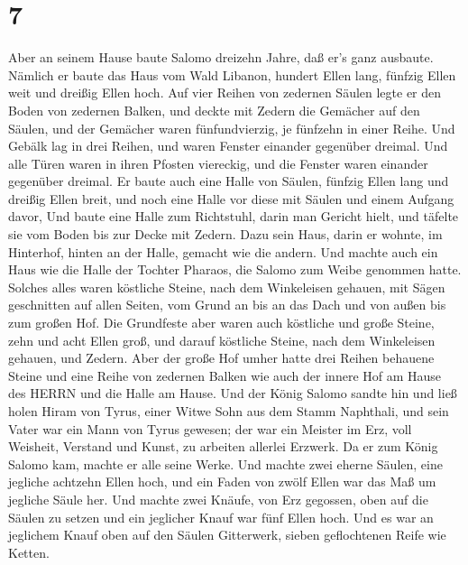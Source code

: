 \hypertarget{section-6}{%
\section{7}\label{section-6}}

 Aber an seinem Hause baute Salomo dreizehn Jahre, daß er's
ganz ausbaute.  Nämlich er baute das Haus vom Wald Libanon,
hundert Ellen lang, fünfzig Ellen weit und dreißig Ellen hoch. Auf vier
Reihen von zedernen Säulen legte er den Boden von zedernen Balken,
 und deckte mit Zedern die Gemächer auf den Säulen, und der
Gemächer waren fünfundvierzig, je fünfzehn in einer Reihe. 
Und Gebälk lag in drei Reihen, und waren Fenster einander gegenüber
dreimal.  Und alle Türen waren in ihren Pfosten viereckig,
und die Fenster waren einander gegenüber dreimal.  Er baute
auch eine Halle von Säulen, fünfzig Ellen lang und dreißig Ellen breit,
und noch eine Halle vor diese mit Säulen und einem Aufgang davor,
 Und baute eine Halle zum Richtstuhl, darin man Gericht
hielt, und täfelte sie vom Boden bis zur Decke mit Zedern. 
Dazu sein Haus, darin er wohnte, im Hinterhof, hinten an der Halle,
gemacht wie die andern. Und machte auch ein Haus wie die Halle der
Tochter Pharaos, die Salomo zum Weibe genommen hatte. 
Solches alles waren köstliche Steine, nach dem Winkeleisen gehauen, mit
Sägen geschnitten auf allen Seiten, vom Grund an bis an das Dach und von
außen bis zum großen Hof.  Die Grundfeste aber waren auch
köstliche und große Steine, zehn und acht Ellen groß,  und
darauf köstliche Steine, nach dem Winkeleisen gehauen, und Zedern.
 Aber der große Hof umher hatte drei Reihen behauene Steine
und eine Reihe von zedernen Balken wie auch der innere Hof am Hause des
HERRN und die Halle am Hause.  Und der König Salomo sandte
hin und ließ holen Hiram von Tyrus,  einer Witwe Sohn aus
dem Stamm Naphthali, und sein Vater war ein Mann von Tyrus gewesen; der
war ein Meister im Erz, voll Weisheit, Verstand und Kunst, zu arbeiten
allerlei Erzwerk. Da er zum König Salomo kam, machte er alle seine
Werke.  Und machte zwei eherne Säulen, eine jegliche
achtzehn Ellen hoch, und ein Faden von zwölf Ellen war das Maß um
jegliche Säule her.  Und machte zwei Knäufe, von Erz
gegossen, oben auf die Säulen zu setzen und ein jeglicher Knauf war fünf
Ellen hoch.  Und es war an jeglichem Knauf oben auf den
Säulen Gitterwerk, sieben geflochtenen Reife wie Ketten. 
